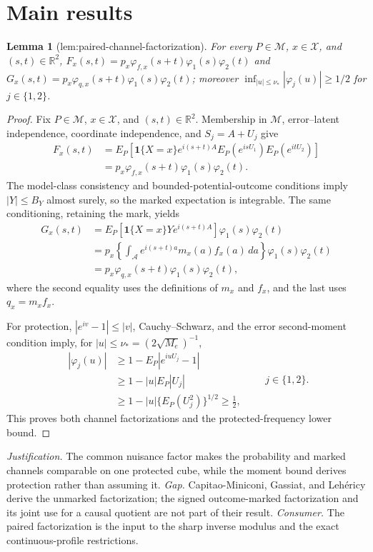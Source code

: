 \documentclass{article}
\newtheorem{lemma}{Lemma}
\begin{document}
\section{Main results}

\begin{lemma}[lem:paired-channel-factorization]\label{lem:paired-channel-factorization}
For every \(P\in\mathcal M\), \(x\in\mathcal X\), and \((s,t)\in\mathbb R^2\), \(F_x(s,t)=p_x\varphi_{f,x}(s+t)\varphi_1(s)\varphi_2(t)\) and \(G_x(s,t)=p_x\varphi_{q,x}(s+t)\varphi_1(s)\varphi_2(t)\); moreover \(\inf_{|u|\le\nu_*}|\varphi_j(u)|\ge1/2\) for \(j\in\{1,2\}\).
\end{lemma}
\begin{proof}
Fix \(P\in\mathcal M\), \(x\in\mathcal X\), and \((s,t)\in\mathbb R^2\).  Membership in \(\mathcal M\), error--latent independence, coordinate independence, and \(S_j=A+U_j\) give
\[
\begin{aligned}
F_x(s,t)
&=E_P\!\left[\mathbf 1\{X=x\}e^{i(s+t)A}
 E_P(e^{isU_1})E_P(e^{itU_2})\right]\\
&=p_x\varphi_{f,x}(s+t)\varphi_1(s)\varphi_2(t).
\end{aligned}
\]
The model-class consistency and bounded-potential-outcome conditions imply \(|Y|\le B_Y\) almost surely, so the marked expectation is integrable.  The same conditioning, retaining the mark, yields
\[
\begin{aligned}
G_x(s,t)
&=E_P\!\left[\mathbf 1\{X=x\}Y e^{i(s+t)A}\right]
  \varphi_1(s)\varphi_2(t)\\
&=p_x\left\{\int_{\mathcal A}e^{i(s+t)a}m_x(a)f_x(a)\,da\right\}
  \varphi_1(s)\varphi_2(t)\\
&=p_x\varphi_{q,x}(s+t)\varphi_1(s)\varphi_2(t),
\end{aligned}
\]
where the second equality uses the definitions of \(m_x\) and \(f_x\), and the last uses \(q_x=m_xf_x\).

For protection, \(|e^{iv}-1|\le |v|\), Cauchy--Schwarz, and the error second-moment condition imply, for \(|u|\le\nu_*=(2\sqrt{M_e})^{-1}\),
\[
\begin{aligned}
|\varphi_j(u)|
&\ge 1-E_P|e^{iuU_j}-1|\\
&\ge 1-|u|E_P|U_j|\\
&\ge 1-|u|\{E_P(U_j^2)\}^{1/2}
\ge \frac12,
\end{aligned}
\qquad j\in\{1,2\}.
\]
This proves both channel factorizations and the protected-frequency lower bound.
\end{proof}
\par\smallskip\noindent \textit{Justification.} The common nuisance factor makes the probability and marked channels comparable on one protected cube, while the moment bound derives protection rather than assuming it. \textit{Gap.} Capitao-Miniconi, Gassiat, and Lehéricy derive the unmarked factorization; the signed outcome-marked factorization and its joint use for a causal quotient are not part of their result. \textit{Consumer.} The paired factorization is the input to the sharp inverse modulus and the exact continuous-profile restrictions.
\end{document}
